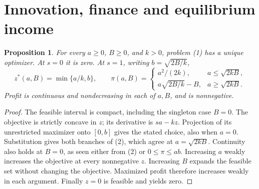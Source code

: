 \documentclass[11pt]{article}
\newtheorem{proposition}[theorem]{Proposition}
\begin{document}
\section{Innovation, finance and equilibrium income}
\begin{proposition}\label{firm}
For every $a\geq0$, $B\geq0$, and $k>0$, problem (1) has a unique optimizer.
At $s=0$ it is zero. At $s=1$, writing $b=\sqrt{2B/k}$,
\[
 z^*(a,B)=\min\{a/k,b\},\qquad
 \pi(a,B)=
 \begin{cases}a^2/(2k),&a\leq\sqrt{2kB},\\
 a\sqrt{2B/k}-B,&a\geq\sqrt{2kB}.
 \end{cases}                                                     \tag{2}
\]
Profit is continuous and nondecreasing in each of $a,B$, and is nonnegative.
\end{proposition}
\begin{proof}
The feasible interval is compact, including the singleton case $B=0$.
The objective is strictly concave in $z$; its derivative is $sa-kz$.
Projection of its unrestricted maximizer onto $[0,b]$ gives the stated
choice, also when $a=0$. Substitution gives both branches of (2), which
agree at $a=\sqrt{2kB}$. Continuity also holds at $B=0$, as seen either
from (2) or $0\leq\pi\leq ab$. Increasing $a$ weakly increases the
objective at every nonnegative $z$. Increasing $B$ expands the feasible
set without changing the objective. Maximized profit therefore increases
weakly in each argument. Finally $z=0$ is feasible and yields zero.
\end{proof}
\end{document}
